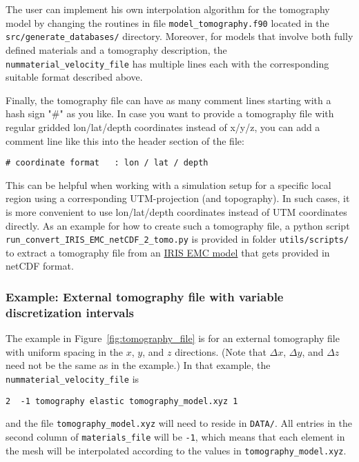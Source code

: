 \noindent
The user can implement his own interpolation algorithm for the tomography
model by changing the routines in file \texttt{model\_tomography.f90} located
in the \texttt{src/generate\_databases/} directory. Moreover, for
models that involve both fully defined materials and a tomography
description, the \texttt{nummaterial\_velocity\_file} has multiple
lines each with the corresponding suitable format described above.\newline


\noindent
Finally, the tomography file can have as many comment lines starting with a hash sign "\#" as you like.
In case you want to provide a tomography file with regular gridded lon/lat/depth coordinates instead of x/y/z,
you can add a comment line like this into the header section of the file:
{\small
\begin{verbatim}
# coordinate format   : lon / lat / depth
\end{verbatim}
}
\noindent
This can be helpful when working with a simulation setup for a specific local region using a corresponding UTM-projection (and topography).
In such cases, it is more convenient to use lon/lat/depth coordinates instead of UTM coordinates directly.\newline
As an example for how to create such a tomography file, a python script \texttt{run\_convert\_IRIS\_EMC\_netCDF\_2\_tomo.py} is provided in
folder \texttt{utils/scripts/} to extract a tomography file from an \href{https://ds.iris.edu/ds/products/emc-earthmodels/}{IRIS EMC model}
that gets provided in netCDF format.



\subsubsection*{Example: External tomography file with variable discretization intervals}

The example in Figure~\ref{fig:tomography_file} is for an external tomography file with uniform spacing in the $x$, $y$, and $z$ directions. (Note that $\Delta x$, $\Delta y$, and $\Delta z$ need not be the same as in the example.) In that example, the  \texttt{nummaterial\_velocity\_file} is
%
\begin{verbatim}
2  -1 tomography elastic tomography_model.xyz 1
\end{verbatim}
%
and the file \texttt{tomography\_model.xyz} will need to reside in \texttt{DATA/}. All entries in the second column of \texttt{materials\_file} will be \texttt{-1}, which means that each element in the mesh will be interpolated according to the values in \texttt{tomography\_model.xyz}.\newline

